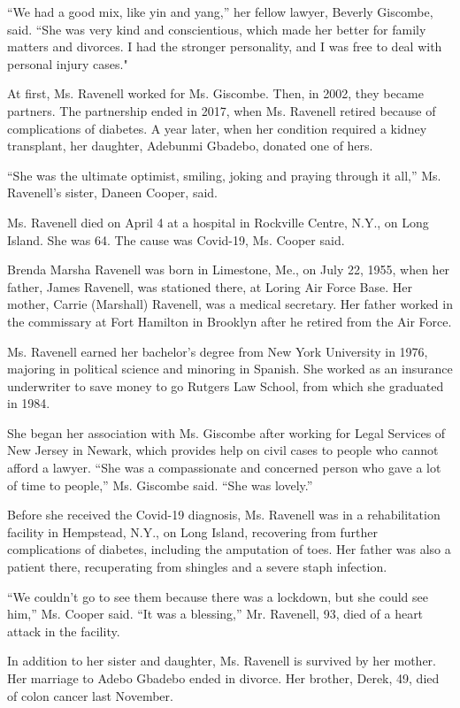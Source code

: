 ``We had a good mix, like yin and yang,'' her fellow lawyer, Beverly
Giscombe, said. ``She was very kind and conscientious, which made her
better for family matters and divorces. I had the stronger personality,
and I was free to deal with personal injury cases."

At first, Ms. Ravenell worked for Ms. Giscombe. Then, in 2002, they
became partners. The partnership ended in 2017, when Ms. Ravenell
retired because of complications of diabetes. A year later, when her
condition required a kidney transplant, her daughter, Adebunmi Gbadebo,
donated one of hers.

``She was the ultimate optimist, smiling, joking and praying through it
all,'' Ms. Ravenell's sister, Daneen Cooper, said.

Ms. Ravenell died on April 4 at a hospital in Rockville Centre, N.Y., on
Long Island. She was 64. The cause was Covid-19, Ms. Cooper said.

Brenda Marsha Ravenell was born in Limestone, Me., on July 22, 1955,
when her father, James Ravenell, was stationed there, at Loring Air
Force Base. Her mother, Carrie (Marshall) Ravenell, was a medical
secretary. Her father worked in the commissary at Fort Hamilton in
Brooklyn after he retired from the Air Force.

Ms. Ravenell earned her bachelor's degree from New York University in
1976, majoring in political science and minoring in Spanish. She worked
as an insurance underwriter to save money to go Rutgers Law School, from
which she graduated in 1984.

She began her association with Ms. Giscombe after working for Legal
Services of New Jersey in Newark, which provides help on civil cases to
people who cannot afford a lawyer. ``She was a compassionate and
concerned person who gave a lot of time to people,'' Ms. Giscombe said.
``She was lovely.''

Before she received the Covid-19 diagnosis, Ms. Ravenell was in a
rehabilitation facility in Hempstead, N.Y., on Long Island, recovering
from further complications of diabetes, including the amputation of
toes. Her father was also a patient there, recuperating from shingles
and a severe staph infection.

``We couldn't go to see them because there was a lockdown, but she could
see him,'' Ms. Cooper said. ``It was a blessing,'' Mr. Ravenell, 93,
died of a heart attack in the facility.

In addition to her sister and daughter, Ms. Ravenell is survived by her
mother. Her marriage to Adebo Gbadebo ended in divorce. Her brother,
Derek, 49, died of colon cancer last November.

